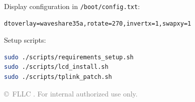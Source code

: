 \documentclass[11pt,a4paper]{article}
\begin{document}
Display configuration in \texttt{/boot/config.txt}:
\begin{lstlisting}
dtoverlay=waveshare35a,rotate=270,invertx=1,swapxy=1
\end{lstlisting}

Setup scripts:
\begin{lstlisting}[language=bash]
sudo ./scripts/requirements_setup.sh
sudo ./scripts/lcd_install.sh
sudo ./scripts/tplink_patch.sh
\end{lstlisting}

\vfill
\begin{center}
\textcolor{gray}{\small\copyright\ FLLC \the\year.  For internal authorized use only.}
\end{center}
\end{document}
